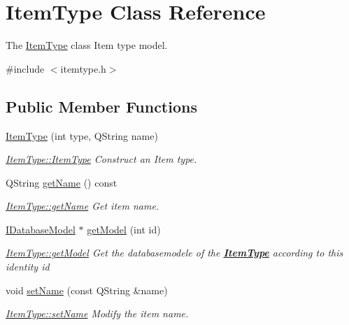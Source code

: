 \hypertarget{classItemType}{\section{Item\+Type Class Reference}
\label{classItemType}
}


The \hyperlink{classItemType}{Item\+Type} class Item type model.  




{\ttfamily \#include $<$itemtype.\+h$>$}

\subsection*{Public Member Functions}
\begin{DoxyCompactItemize}
\item 
\hyperlink{classItemType_ae6db761c2f205fc9447d781015afb982}{Item\+Type} (int type, Q\+String name)
\begin{DoxyCompactList}\small\item\em \hyperlink{classItemType_ae6db761c2f205fc9447d781015afb982}{Item\+Type\+::\+Item\+Type} Construct an Item type. \end{DoxyCompactList}\item 
Q\+String \hyperlink{classItemType_a735cd1b13b8b4dc5c2d26793468f5516}{get\+Name} () const 
\begin{DoxyCompactList}\small\item\em \hyperlink{classItemType_a735cd1b13b8b4dc5c2d26793468f5516}{Item\+Type\+::get\+Name} Get item name. \end{DoxyCompactList}\item 
\hyperlink{classIDatabaseModel}{I\+Database\+Model} $\ast$ \hyperlink{classItemType_a4b2846df0342282952741331808c703d}{get\+Model} (int id)
\begin{DoxyCompactList}\small\item\em \hyperlink{classItemType_a4b2846df0342282952741331808c703d}{Item\+Type\+::get\+Model} Get the databasemodele of the {\bfseries \hyperlink{classItemType}{Item\+Type}} according to this identity {\itshape id} \end{DoxyCompactList}\item 
void \hyperlink{classItemType_a0ca95f11671b35aa0374b21f3ae4813a}{set\+Name} (const Q\+String \&name)
\begin{DoxyCompactList}\small\item\em \hyperlink{classItemType_a0ca95f11671b35aa0374b21f3ae4813a}{Item\+Type\+::set\+Name} Modify the item name. \end{DoxyCompactList}\item 

\end{DoxyCompactItemize}

